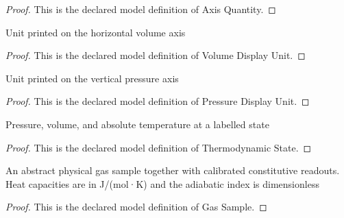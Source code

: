 \begin{proof}
  This is the declared model definition of Axis Quantity.
\end{proof}
\begin{definition}
  \label{def:physics:phyx-mini-0434:phyxminiproblems-problemphyxmini0434-volumedisplayunit}
  Unit printed on the horizontal volume axis
\end{definition}
\begin{proof}
  This is the declared model definition of Volume Display Unit.
\end{proof}
\begin{definition}
  \label{def:physics:phyx-mini-0434:phyxminiproblems-problemphyxmini0434-pressuredisplayunit}
  Unit printed on the vertical pressure axis
\end{definition}
\begin{proof}
  This is the declared model definition of Pressure Display Unit.
\end{proof}
\begin{definition}
  \label{def:physics:phyx-mini-0434:phyxminiproblems-problemphyxmini0434-thermodynamicstate}
  Pressure, volume, and absolute temperature at a labelled state
\end{definition}
\begin{proof}
  This is the declared model definition of Thermodynamic State.
\end{proof}
\begin{definition}
  \label{def:physics:phyx-mini-0434:phyxminiproblems-problemphyxmini0434-gassample}
  An abstract physical gas sample together with calibrated constitutive readouts. Heat capacities are in J/(mol·K) and the adiabatic index is dimensionless
\end{definition}
\begin{proof}
  This is the declared model definition of Gas Sample.
\end{proof}
